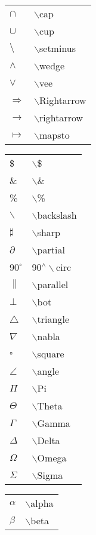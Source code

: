\documentclass[report, twoside, UTF8, AutoFakeBold = 1, AutoFakeSlant, zihao = -4]{config}
\begin{document}
\begin{center}
\begin{tabular}{ll}
    $\cap $ &  $\backslash$cap \\
    $\cup $ &  $\backslash$cup \\
    $\setminus $ &  $\backslash$setminus \\
    $\wedge $ &  $\backslash$wedge \\
    $\vee $ &  $\backslash$vee \\
    $\Rightarrow$ &  $\backslash$Rightarrow \\
    $\rightarrow$ &  $\backslash$rightarrow \\
    $\mapsto$ &  $\backslash$mapsto \\
    \end{tabular}
    \hspace*{1ex}
    \begin{tabular}{ll}
    \$ & $\backslash$\$ \\
    \& & $\backslash$\& \\
    \% & $\backslash$\% \\
    $\backslash$ & $\backslash$backslash \\
    $\sharp$ & $\backslash$sharp \\
    $\partial$ &  $\backslash$partial \\
    $90^\circ$ &  90$^\wedge\backslash$circ \\
    $\parallel$ &  $\backslash$parallel \\
    $\bot$ &  $\backslash$bot \\
    $\triangle$ &  $\backslash$triangle \\
    $\nabla$ &   $\backslash$nabla \\
    $\square$ &  $\backslash$square \\
    $\angle$ &  $\backslash$angle \\
    $\Pi$ &  $\backslash$Pi \\
    $\Theta$ &  $\backslash$Theta \\
    $\Gamma$ &  $\backslash$Gamma \\
    $\Delta$ &  $\backslash$Delta \\
    $\Omega$ &  $\backslash$Omega \\
    $\Sigma$ &  $\backslash$Sigma \\
    \end{tabular}
    \hspace*{1ex}
    \begin{tabular}{ll}
    $\alpha$ &  $\backslash$alpha \\
    $\beta$ &  $\backslash$beta \\

\end{tabular}
\end{center}
\end{document}
